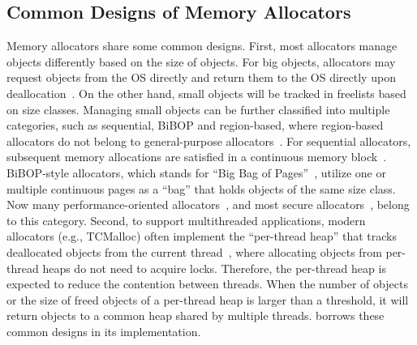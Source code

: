\subsection{Common Designs of Memory Allocators}
\label{sec:commondesign}

Memory allocators share some common designs. First, most allocators manage objects differently based on the size of objects. For big objects, allocators may request objects from the OS directly and return them to the OS directly upon deallocation~\cite{Hoard}. On the other hand, small objects will be tracked in freelists based on size classes. Managing small objects can be further classified into multiple categories, such as sequential, BiBOP and region-based, where region-based allocators do not belong to general-purpose allocators~\cite{DieHarder, Gay:1998:MME:277650.277748}.
For sequential allocators, subsequent memory allocations are satisfied in a continuous memory block~\cite{Cling}. BiBOP-style allocators, which stands for ``Big Bag of Pages''~\cite{hanson1980portable}, utilize one or multiple continuous pages as a ``bag'' that holds objects of the same size class. 
Now many performance-oriented allocators~\cite{tcmalloc, jemalloc, Scalloc}, and most secure allocators~\cite{openbsd, DieHarder, FreeGuard, Guarder}, belong to this category. Second, to support multithreaded applications, modern allocators (e.g., TCMalloc) often implement the ``per-thread heap'' that tracks deallocated objects from the current thread~\cite{tcmallocnew}, where allocating objects from per-thread heaps do not need to acquire locks. Therefore, the per-thread heap is expected to reduce the contention between threads. When the number of objects or the size of freed objects of a per-thread heap is larger than a threshold, it will return objects to a common heap shared by multiple threads. \NM{} borrows these common designs in its implementation. 

 